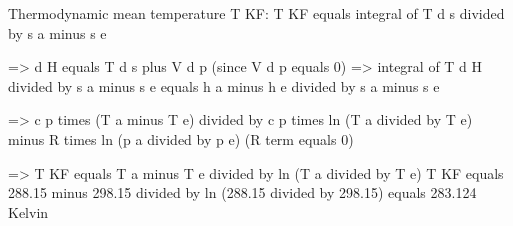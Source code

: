 Thermodynamic mean temperature T KF:  
T KF equals integral of T d s divided by s a minus s e  

=> d H equals T d s plus V d p (since V d p equals 0)  
=> integral of T d H divided by s a minus s e equals h a minus h e divided by s a minus s e  

=> c p times (T a minus T e) divided by c p times ln (T a divided by T e) minus R times ln (p a divided by p e) (R term equals 0)  

=> T KF equals T a minus T e divided by ln (T a divided by T e)  
T KF equals 288.15 minus 298.15 divided by ln (288.15 divided by 298.15) equals 283.124 Kelvin